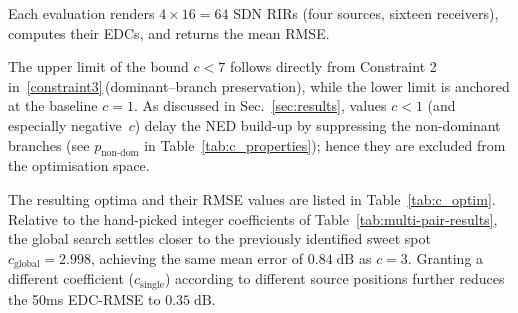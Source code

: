\documentclass[journal]{IEEEtran}
\begin{document}

Each evaluation renders $4\times16=64$ SDN RIRs (four sources, sixteen
receivers), computes their EDCs, and returns the mean RMSE.

The upper limit of the bound \(c<7\) follows directly from Constraint 2 in~\eqref{constraint3}\,(dominant–branch preservation), while the lower limit is anchored at the baseline \(c=1\). 
As discussed in Sec.~\ref{sec:results}, values \(c<1\) (and especially negative~\(c\)) delay the NED build-up by suppressing the non-dominant branches
(see \(p_{\text{non-dom}}\) in Table~\ref{tab:c_properties}); 
hence they are excluded from the optimisation space. 

The resulting optima and their RMSE values are listed in Table~\ref{tab:c_optim}.  
Relative to the hand-picked integer coefficients of Table~\ref{tab:multi-pair-results},  
the global search settles closer to the previously identified sweet spot \(c_{\text{global}} = 2.998\), achieving the same mean error of 
\(0.84\;\text{dB}\) as \(c\!=\!3\).
Granting a different coefficient (\(c_{\text{single}}\)) according to different source positions further reduces the 50ms EDC-RMSE to \(0.35\;\text{dB}\).

\end{document}

